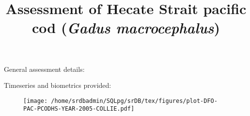 \documentclass[a4paper,10pt]{article}
\title{Assessment of Hecate Strait pacific cod (\textit{Gadus macrocephalus})}
\author{}
\date{}
\begin{document}
\maketitle
\vspace{-0.5in}
\begin{center}
{\large General assessment details:}
\end{center}

\begin{center}
{\large Timeseries and biometrics provided:}

\end{center}
\newpage
\begin{figure}[htbp] %
   \centering
   \vspace*{2in}
   \texttt{[image: /home/srdbadmin/SQLpg/srDB/tex/figures/plot-DFO-PAC-PCODHS-YEAR-2005-COLLIE.pdf]} 
\end{figure}
\end{document}
